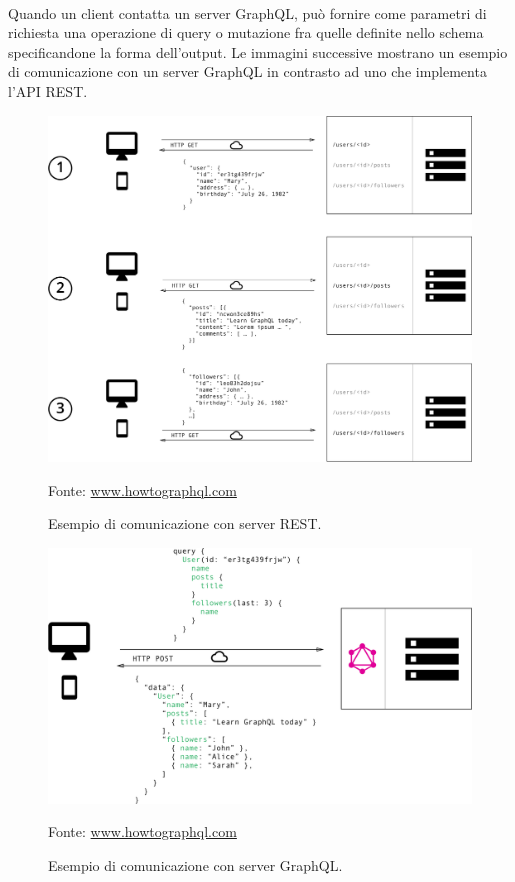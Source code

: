 \documentclass[a4paper, 12pt]{report}
\newcommand{\source}[1]{\caption*{Fonte: {#1}}}
\begin{document}
      \paragraph*{}
      Quando un client contatta un server GraphQL, può fornire come parametri di richiesta una operazione di query o mutazione fra quelle definite nello schema specificandone la forma dell'output.
      Le immagini successive mostrano un esempio di comunicazione con un server GraphQL in contrasto ad uno che implementa l'API REST.
      \begin{figure}[H]
        \includegraphics[width=\textwidth]{rest-communication.png}
        \caption{Esempio di comunicazione con server REST.}
        \source{\href{https://www.howtoGraphQL.com/basics/1-GraphQL-is-the-better-rest/}{www.howtographql.com}}
      \end{figure}
      \begin{figure}[H]
        \includegraphics[width=\textwidth]{graphql-communication.png}
        \caption{Esempio di comunicazione con server GraphQL.}
        \source{\href{https://www.howtoGraphQL.com/basics/1-GraphQL-is-the-better-rest/}{www.howtographql.com}}
      \end{figure}
\end{document}
